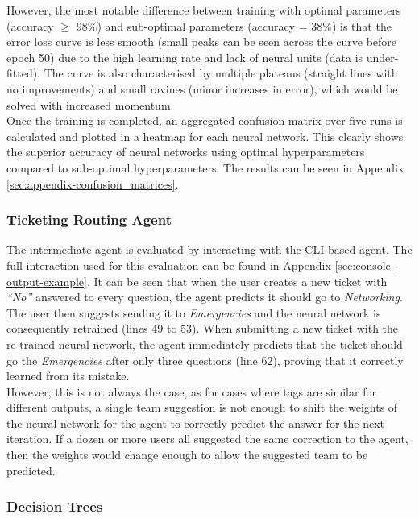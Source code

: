 \documentclass[letterpaper,12pt]{article}
\begin{document}
However, the most notable difference between training with optimal parameters (accuracy $\geqslant$ 98\%) and sub-optimal parameters (accuracy = 38\%) is that the error loss curve is less smooth (small peaks can be seen across the curve before epoch 50) due to the high learning rate and lack of neural units (data is under-fitted). The curve is also characterised by multiple plateaus (straight lines with no improvements) and small ravines (minor increases in error), which would be solved with increased momentum.\\

Once the training is completed, an aggregated confusion matrix over five runs is calculated and plotted in a heatmap for each neural network. This clearly shows the superior accuracy of neural networks using optimal hyperparameters compared to sub-optimal hyperparameters. The results can be seen in Appendix \ref{sec:appendix-confusion_matrices}.

\subsubsection{Ticketing Routing Agent}

The intermediate agent is evaluated by interacting with the CLI-based agent. The full interaction used for this evaluation can be found in Appendix \ref{sec:console-output-example}. It can be seen that when the user creates a new ticket with \textit{``No''} answered to every question, the agent predicts it should go to \textit{Networking}. The user then suggests sending it to \textit{Emergencies} and the neural network is consequently retrained (lines 49 to 53). When submitting a new ticket with the re-trained neural network, the agent immediately predicts that the ticket should go the \textit{Emergencies} after only three questions (line 62), proving that it correctly learned from its mistake.\\

However, this is not always the case, as for cases where tags are similar for different outputs, a single team suggestion is not enough to shift the weights of the neural network for the agent to correctly predict the answer for the next iteration. If a dozen or more users all suggested the same correction to the agent, then the weights would change enough to allow the suggested team to be predicted.

\subsubsection{Decision Trees}
\end{document}
